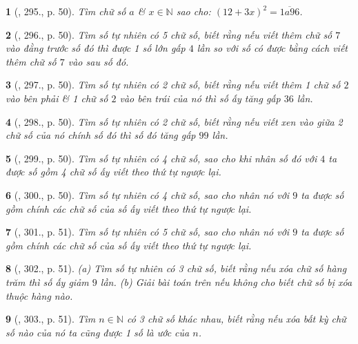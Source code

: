 \documentclass{article}
\newtheorem{baitoan}{}
\begin{document}
\begin{baitoan}[\cite{Binh_Toan_6_tap_1}, 295., p. 50]
	Tìm chữ số $a$ \& $x\in\mathbb{N}$ sao cho: $(12 + 3x)^2 = \overline{1a96}$.
\end{baitoan}

\begin{baitoan}[\cite{Binh_Toan_6_tap_1}, 296., p. 50]
	Tìm số tự nhiên có 5 chữ số, biết rằng nếu viết thêm chữ số $7$ vào đằng trước số đó thì được 1 số lớn gấp $4$ lần so với số có được bằng cách viết thêm chữ số $7$ vào sau số đó.
\end{baitoan}

\begin{baitoan}[\cite{Binh_Toan_6_tap_1}, 297., p. 50]
	Tìm số tự nhiên có 2 chữ số, biết rằng nếu viết thêm 1 chữ số $2$ vào bên phải \& 1 chữ số $2$ vào bên trái của nó thì số ấy tăng gấp $36$ lần.
\end{baitoan}

\begin{baitoan}[\cite{Binh_Toan_6_tap_1}, 298., p. 50]
	Tìm số tự nhiên có 2 chữ số, biết rằng nếu viết xen vào giữa 2 chữ số của nó chính số đó thì số đó tăng gấp $99$ lần.
\end{baitoan}

\begin{baitoan}[\cite{Binh_Toan_6_tap_1}, 299., p. 50]
	Tìm số tự nhiên có 4 chữ số, sao cho khi nhân số đó với $4$ ta được số gồm 4 chữ số ấy viết theo thứ tự ngược lại.
\end{baitoan}

\begin{baitoan}[\cite{Binh_Toan_6_tap_1}, 300., p. 50]
	Tìm số tự nhiên có 4 chữ số, sao cho nhân nó với $9$ ta được số gồm chính các chữ số của số ấy viết theo thứ tự ngược lại.
\end{baitoan}

\begin{baitoan}[\cite{Binh_Toan_6_tap_1}, 301., p. 51]
	Tìm số tự nhiên có 5 chữ số, sao cho nhân nó với $9$ ta được số gồm chính các chữ số của số ấy viết theo thứ tự ngược lại.
\end{baitoan}

\begin{baitoan}[\cite{Binh_Toan_6_tap_1}, 302., p. 51]
	(a) Tìm số tự nhiên có 3 chữ số, biết rằng nếu xóa chữ số hàng trăm thì số ấy giảm $9$ lần. (b) Giải bài toán trên nếu không cho biết chữ số bị xóa thuộc hàng nào.
\end{baitoan}

\begin{baitoan}[\cite{Binh_Toan_6_tap_1}, 303., p. 51]
	Tìm $n\in\mathbb{N}$ có 3 chữ số khác nhau, biết rằng nếu xóa bất kỳ chữ số nào của nó ta cũng được 1 số là ước của $n$.	
\end{baitoan}
\end{document}
